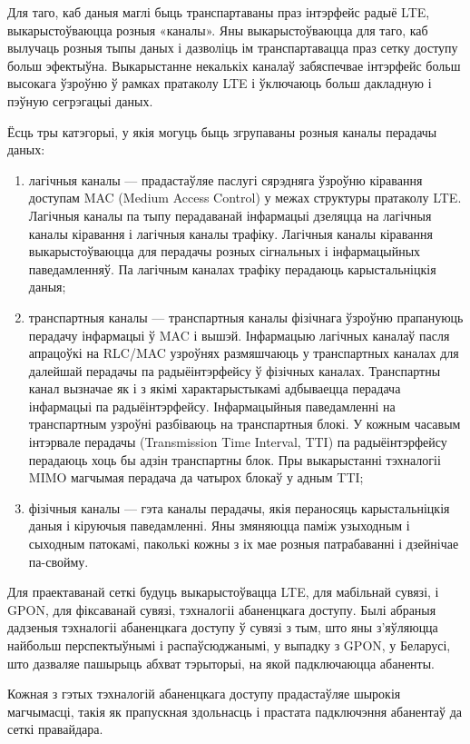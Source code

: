 Для таго, каб даныя маглі быць транспартаваны праз інтэрфейс радыё LTE, выкарыстоўваюцца розныя «каналы». Яны выкарыстоўваюцца для таго, каб вылучаць розныя тыпы даных і дазволіць ім транспартавацца праз сетку доступу больш эфектыўна. Выкарыстанне некалькіх каналаў забяспечвае інтэрфейс больш высокага ўзроўню ў рамках пратаколу LTE і ўключаюць больш дакладную і пэўную сегрэгацыі даных.

Ёсць тры катэгорыі, у якія могуць быць згрупаваны розныя каналы перадачы даных:
\begin{enumerate}
    \item лагічныя каналы --- прадастаўляе паслугі сярэдняга ўзроўню кіравання доступам MAC (Medium Access Control) у межах структуры пратаколу LTE. Лагічныя каналы па тыпу перадаванай інфармацыі дзеляцца на лагічныя каналы кіравання і лагічныя каналы трафіку. Лагічныя каналы кіравання выкарыстоўваюцца для перадачы розных сігнальных і інфармацыйных паведамленняў. Па лагічным каналах трафіку перадаюць карыстальніцкія даныя;
    \item транспартныя каналы --- транспартныя каналы фізічнага ўзроўню прапануюць перадачу інфармацыі ў MAC і вышэй. Інфармацыю лагічных каналаў пасля апрацоўкі на RLC/MAC узроўнях размяшчаюць у транспартных каналах для далейшай перадачы па радыёінтэрфейсу ў фізічных каналах. Транспартны канал вызначае як і з якімі характарыстыкамі адбываецца перадача інфармацыі па радыёінтэрфейсу. Інфармацыйныя паведамленні на транспартным узроўні разбіваюць на транспартныя блокі. У кожным часавым інтэрвале перадачы (Transmission Time Interval, TTI) па радыёінтэрфейсу перадаюць хоць бы адзін транспартны блок. Пры выкарыстанні тэхналогіі MIMO магчымая перадача да чатырох блокаў у адным TTI;
    \item фізічныя каналы --- гэта каналы перадачы, якія пераносяць карыстальніцкія даныя і кіруючыя паведамленні. Яны змяняюцца паміж узыходным і сыходным патокамі, паколькі кожны з іх мае розныя патрабаванні і дзейнічае па-свойму.
\end{enumerate}

Для праектаванай сеткі будуць выкарыстоўвацца LTE, для мабільнай сувязі, і
GPON, для фіксаванай сувязі, тэхналогіі абаненцкага доступу.
Былі абраныя дадзеныя тэхналогіі абаненцкага доступу ў сувязі з тым,
што яны з'яўляюцца найбольш перспектыўнымі і распаўсюджанымі, у выпадку з GPON, у Беларусі, што дазваляе пашырыць абхват тэрыторыі, на якой
падключаюцца абаненты.

Кожная з гэтых тэхналогій абаненцкага доступу прадастаўляе шырокія
магчымасці, такія як прапускная здольнасць і прастата падключэння
абанентаў да сеткі правайдара.


